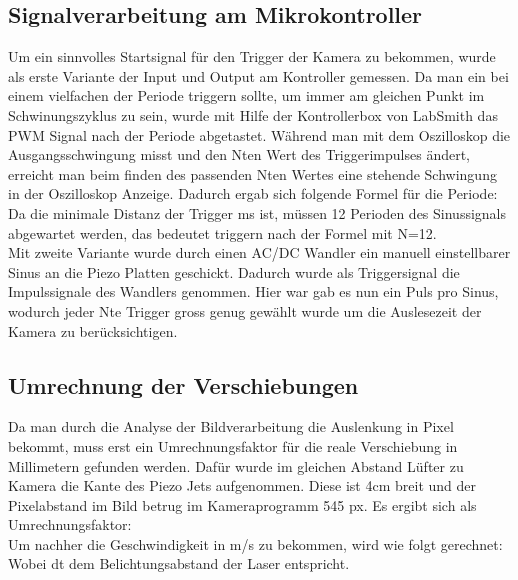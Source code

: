 \subsection{Signalverarbeitung am Mikrokontroller}
Um ein sinnvolles Startsignal für den Trigger der Kamera zu bekommen, wurde als erste Variante der Input und Output am Kontroller gemessen. Da man ein bei einem vielfachen der Periode triggern sollte, um immer am gleichen Punkt im Schwinungszyklus zu sein, wurde mit Hilfe der Kontrollerbox von LabSmith das PWM Signal nach der Periode abgetastet. Während man mit dem Oszilloskop die Ausgangsschwingung misst und den Nten Wert des Triggerimpulses ändert, erreicht man beim finden des passenden Nten Wertes eine stehende Schwingung in der Oszilloskop Anzeige. Dadurch ergab sich folgende Formel für die Periode:\\
Da die minimale Distanz der Trigger ms ist, müssen 12 Perioden des Sinussignals abgewartet werden, das bedeutet triggern nach der Formel mit N=12.\\
Mit zweite Variante wurde durch einen AC/DC Wandler ein manuell einstellbarer Sinus an die Piezo Platten geschickt. Dadurch wurde als Triggersignal die Impulssignale des Wandlers genommen. Hier war gab es nun ein Puls pro Sinus, wodurch jeder Nte Trigger gross genug gewählt wurde um die Auslesezeit der Kamera zu berücksichtigen.
\subsection{Umrechnung der Verschiebungen}   
Da man durch die Analyse der Bildverarbeitung die Auslenkung in Pixel bekommt, muss erst ein Umrechnungsfaktor für die reale Verschiebung in Millimetern gefunden werden. Dafür wurde im gleichen Abstand Lüfter zu Kamera die Kante des Piezo Jets aufgenommen. Diese ist 4cm breit und der Pixelabstand im Bild betrug im Kameraprogramm 545 px. Es ergibt sich als Umrechnungsfaktor:\\
Um nachher die Geschwindigkeit in m/s zu bekommen, wird wie folgt gerechnet:\\
Wobei dt dem Belichtungsabstand der Laser entspricht.
